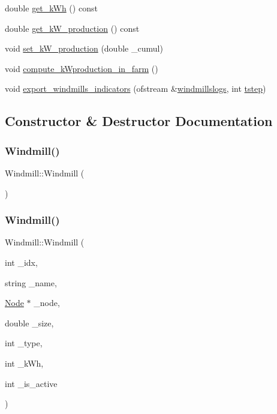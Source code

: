 \begin{DoxyCompactItemize}
\item 
double \mbox{\hyperlink{class_windmill_aebd4e86003db02f68273aa9a303f0f59}{get\+\_\+k\+Wh}} () const
\item 
double \mbox{\hyperlink{class_windmill_aa86a674862be49762f19203f646b6760}{get\+\_\+k\+W\+\_\+production}} () const
\item 
void \mbox{\hyperlink{class_windmill_a5c4a7f5a3a66db3bd1f27448d215bc7b}{set\+\_\+k\+W\+\_\+production}} (double \+\_\+cumul)
\item 
void \mbox{\hyperlink{class_windmill_a5a84117a760afc88ab76aa84f15bb4eb}{compute\+\_\+k\+Wproduction\+\_\+in\+\_\+farm}} ()
\item 
void \mbox{\hyperlink{class_windmill_a5f1a3de08f118e3ddffca90f324539b0}{export\+\_\+windmills\+\_\+indicators}} (ofstream \&\mbox{\hyperlink{simulator_2main_8cpp_a419cdf809e883878510d2fd0f98a5375}{windmillslogs}}, int \mbox{\hyperlink{thread__vessels_8cpp_a84bc73d278de929ec9974e1a95d9b23a}{tstep}})
\end{DoxyCompactItemize}


\subsection{Constructor \& Destructor Documentation}
\mbox{\label{class_windmill_a1c1c3d64318b42e398b44a184b20aacd}} 
\subsubsection{\texorpdfstring{Windmill()}{Windmill()}\hspace{0.1cm}{\footnotesize\ttfamily [1/3]}}
{\footnotesize\ttfamily Windmill\+::\+Windmill (\begin{DoxyParamCaption}{ }\end{DoxyParamCaption})}

\mbox{\label{class_windmill_a4b1638f4202bc635071f6f0034cdc2f0}} 
\subsubsection{\texorpdfstring{Windmill()}{Windmill()}\hspace{0.1cm}{\footnotesize\ttfamily [2/3]}}
{\footnotesize\ttfamily Windmill\+::\+Windmill (\begin{DoxyParamCaption}\item[{int}]{\+\_\+idx,  }\item[{string}]{\+\_\+name,  }\item[{\mbox{\hyperlink{class_node}{Node}} $\ast$}]{\+\_\+node,  }\item[{double}]{\+\_\+size,  }\item[{int}]{\+\_\+type,  }\item[{int}]{\+\_\+k\+Wh,  }\item[{int}]{\+\_\+is\+\_\+active }\end{DoxyParamCaption})}

